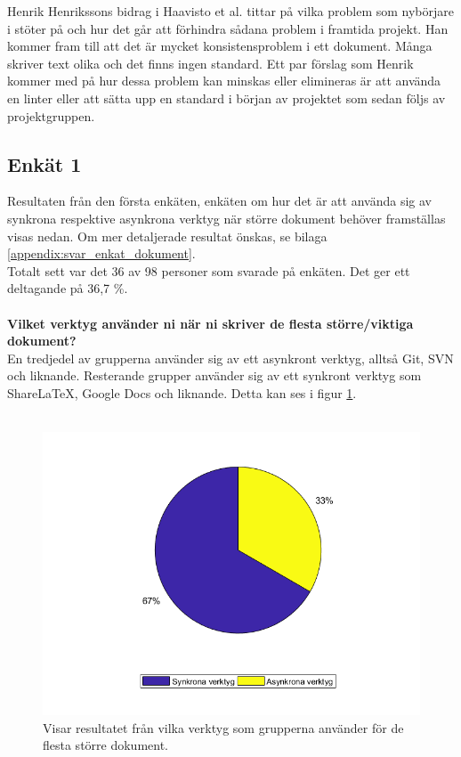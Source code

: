 Henrik Henrikssons bidrag i Haavisto et al. \cite{Haavisto954095} tittar på vilka problem som nybörjare i \latex stöter på och hur det går att förhindra sådana problem i framtida projekt. Han kommer fram till att det är mycket konsistensproblem i ett \latex dokument. Många skriver text olika och det finns ingen standard. Ett par förslag som Henrik kommer med på hur dessa problem kan minskas eller elimineras är att använda en linter eller att sätta upp en standard i början av projektet som sedan följs av projektgruppen.

\subsection{Enkät 1}
Resultaten från den första enkäten, enkäten om hur det är att använda sig av synkrona respektive asynkrona verktyg när större dokument behöver framställas visas nedan. Om mer detaljerade resultat önskas, se bilaga \ref{appendix:svar_enkat_dokument}.\\
Totalt sett var det 36 av 98 personer som svarade på enkäten. Det ger ett deltagande på 36,7 \%.\\
\\\textbf{Vilket verktyg använder ni när ni skriver de flesta större/viktiga dokument?}\\
En tredjedel av grupperna använder sig av ett asynkront verktyg, alltså Git, SVN och liknande. Resterande grupper använder sig av ett synkront verktyg som ShareLaTeX, Google Docs och liknande. Detta kan ses i figur \ref{fig:most_used_tool}.\\\\

\begin{figure}[H]	
	\includegraphics[scale=0.5]{figures/tool_used_for_documents.png}
	\centering
	\caption{Visar resultatet från vilka verktyg som grupperna använder för de flesta större dokument.}
	\label{fig:most_used_tool}
\end{figure}

